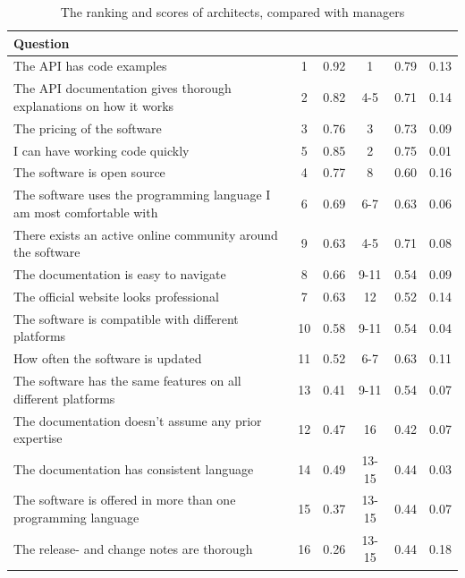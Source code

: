 \documentclass{article}
\begin{document}
\begin{table}[H]
\begin{tabularx}{\columnwidth}{X|c:c|c:c|c}
\textbf{Question}                                                    &     & &   & & \\ \hline
The API has code examples & 1 & 0.92 & 1 & 0.79 & 0.13  \\ \hline
The API documentation gives thorough explanations on how it works     & 2 & 0.82 & 4-5 & 0.71 & 0.14  \\ \hline
The pricing of the software & 3 & 0.76 & 3 & 0.73 & 0.09  \\ \hline
I can have working code quickly & 5 & 0.85 &            2 & 0.75 & 0.01  \\ \hline
The software is open source & 4 & 0.77 & 8 & 0.60           & 0.16  \\ \hline
The software uses the programming language I am most comfortable with & 6 & 0.69 &          6-7 & 0.63 & 0.06  \\ \hline
There exists an active online community around the software & 9 & 0.63       & 4-5 & 0.71 & 0.08  \\ \hline
The documentation is easy to navigate & 8 & 0.66 & 9-11 & 0.54 & 0.09  \\ \hline
The official website looks professional & 7 & 0.63 & 12 & 0.52 & 0.14  \\ \hline
The software is compatible with different platforms                   & 10 & 0.58 & 9-11 & 0.54 & 0.04  \\ \hline
How often the software is updated & 11 & 0.52 & 6-7 & 0.63 & 0.11  \\ \hline
The software has the same features on all different platforms         & 13 & 0.41 & 9-11 & 0.54 & 0.07  \\ \hline
The documentation doesn't assume any prior expertise &        12 & 0.47 & 16 & 0.42 & 0.07  \\ \hline
The documentation has consistent language & 14 & 0.49       & 13-15 & 0.44 & 0.03  \\ \hline
The software is offered in more than one programming language & 15 & 0.37 & 13-15 & 0.44 & 0.07  \\ \hline
The release- and change notes are thorough & 16 & 0.26 & 13-15 & 0.44 & 0.18  \\ \hline
\end{tabularx}
\caption{The ranking and scores of architects, compared with managers}
\label{tab:arch-devs}
\end{table}
\end{document}
